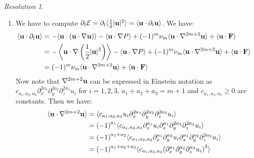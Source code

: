 \documentclass[10pt,a4paper]{article}
\theoremstyle{definition}
\theoremstyle{remark}
\newtheorem*{res}{Resolution}
\begin{document}
\begin{res}\hfill
  \begin{enumerate}
    \item We have to compute $\partial_t \mathcal{E}= \partial_t \langle \frac{1}{2} |\boldsymbol{\mathrm{u}}|^2 \rangle= \langle \boldsymbol{\mathrm{u}} \cdot \partial_t \boldsymbol{\mathrm{u}} \rangle$. We have:
          \begin{align*}
            \langle \boldsymbol{\mathrm{u}} \cdot \partial_t \boldsymbol{\mathrm{u}} \rangle & = - \langle \boldsymbol{\mathrm{u}} \cdot (\boldsymbol{\mathrm{u}} \cdot \nabla \boldsymbol{\mathrm{u}})\rangle - \langle \boldsymbol{\mathrm{u}} \cdot \nabla P \rangle + (-1)^m \nu_m \langle \boldsymbol{\mathrm{u}} \cdot \nabla^{2m+2} \boldsymbol{\mathrm{u}} \rangle + \langle \boldsymbol{\mathrm{u}} \cdot \boldsymbol{\mathrm{F}} \rangle                            \\
                                                           & = -  \left\langle \boldsymbol{\mathrm{u}} \cdot \nabla \left(\frac{1}{2}|\boldsymbol{\mathrm{u}}|^2\right) \right\rangle - \langle \boldsymbol{\mathrm{u}} \cdot \nabla P \rangle  + (-1)^m \nu_m \langle \boldsymbol{\mathrm{u}} \cdot \nabla^{2m+2} \boldsymbol{\mathrm{u}} \rangle + \langle \boldsymbol{\mathrm{u}} \cdot \boldsymbol{\mathrm{F}} \rangle \\
                                                           & = (-1)^m \nu_m \langle \boldsymbol{\mathrm{u}} \cdot \nabla^{2m+2} \boldsymbol{\mathrm{u}} \rangle + \langle \boldsymbol{\mathrm{u}} \cdot \boldsymbol{\mathrm{F}} \rangle                                                                                                                                 \\
          \end{align*}
          Now note that $\nabla^{2m+2} \boldsymbol{\mathrm{u}}$ can be expressed in Einstein notation as $c_{a_1,a_2,a_3}\partial_x^{2a_1} \partial_y^{2a_2} \partial_z^{2a_3} u_i$ for $i=1,2,3$, $a_1+a_2+a_3 = m+1$ and $c_{a_1,a_2,a_3}\geq 0$ are constants.
          Then we have:
          \begin{align*}
            \langle \vf{u} \cdot \nabla^{2m+2} \vf{u} \rangle & = \langle c_{a_1,a_2,a_3}u_i \partial_x^{2a_1} \partial_y^{2a_2} \partial_z^{2a_3} u_i \rangle                                                \\
                                                              & = {(-1)}^{a_1} \langle c_{a_1,a_2,a_3}\partial_x^{a_1} u_i\partial_x^{a_1} \partial_y^{2a_2} \partial_z^{2a_3} u_i \rangle                    \\
                                                              & ={(-1)}^{a_1+a_2} \langle c_{a_1,a_2,a_3}\partial_x^{a_1} \partial_y^{a_2} u_i\partial_x^{a_1} \partial_y^{a_2} \partial_z^{2a_3} u_i \rangle \\
                                                              & ={(-1)}^{a_1+a_2+a_3} \langle c_{a_1,a_2,a_3}{(\partial_x^{a_1} \partial_y^{a_2}\partial_z^{a_3} u_i)}^2 \rangle

\end{align*}
\end{enumerate}
\end{res}
\end{document}
